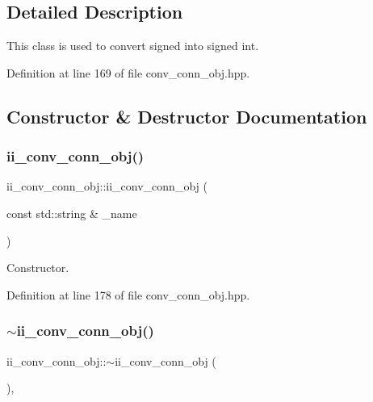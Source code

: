 \subsection{Detailed Description}
This class is used to convert signed into signed int. 

Definition at line 169 of file conv\+\_\+conn\+\_\+obj.\+hpp.



\subsection{Constructor \& Destructor Documentation}
\mbox{\label{classii__conv__conn__obj_ac5a113e9ee4a526b242a2b2c452ecbe3}} 
\subsubsection{\texorpdfstring{ii\+\_\+conv\+\_\+conn\+\_\+obj()}{ii\_conv\_conn\_obj()}}
{\footnotesize\ttfamily ii\+\_\+conv\+\_\+conn\+\_\+obj\+::ii\+\_\+conv\+\_\+conn\+\_\+obj (\begin{DoxyParamCaption}\item[{const std\+::string \&}]{\+\_\+name }\end{DoxyParamCaption})\hspace{0.3cm}{\ttfamily [inline]}}



Constructor. 



Definition at line 178 of file conv\+\_\+conn\+\_\+obj.\+hpp.

\mbox{\label{classii__conv__conn__obj_a988ebba9cdae4f2bea8dbf3cdd054692}} 
\subsubsection{\texorpdfstring{$\sim$ii\+\_\+conv\+\_\+conn\+\_\+obj()}{~ii\_conv\_conn\_obj()}}
{\footnotesize\ttfamily ii\+\_\+conv\+\_\+conn\+\_\+obj\+::$\sim$ii\+\_\+conv\+\_\+conn\+\_\+obj (\begin{DoxyParamCaption}{ }\end{DoxyParamCaption})\hspace{0.3cm}{\ttfamily [override]}, {\ttfamily [default]}}



